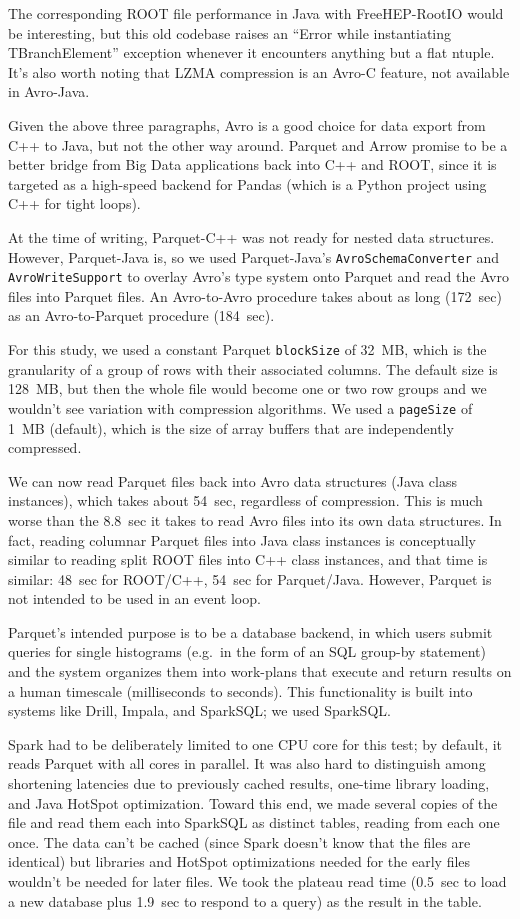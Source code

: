 \documentclass{article}
\begin{document}
The corresponding ROOT file performance in Java with FreeHEP-RootIO would be interesting, but this old codebase raises an ``Error while instantiating TBranchElement'' exception whenever it encounters anything but a flat ntuple. It's also worth noting that LZMA compression is an Avro-C feature, not available in Avro-Java.

Given the above three paragraphs, Avro is a good choice for data export from C++ to Java, but not the other way around. Parquet and Arrow promise to be a better bridge from Big Data applications back into C++ and ROOT, since it is targeted as a high-speed backend for Pandas (which is a Python project using C++ for tight loops).

At the time of writing, Parquet-C++ was not ready for nested data structures. However, Parquet-Java is, so we used Parquet-Java's {\tt AvroSchemaConverter} and {\tt AvroWriteSupport} to overlay Avro's type system onto Parquet and read the Avro files into Parquet files. An Avro-to-Avro procedure takes about as long (172~sec) as an Avro-to-Parquet procedure (184~sec). 

For this study, we used a constant Parquet {\tt blockSize} of 32~MB, which is the granularity of a group of rows with their associated columns. The default size is 128~MB, but then the whole file would become one or two row groups and we wouldn't see variation with compression algorithms. We used a {\tt pageSize} of 1~MB (default), which is the size of array buffers that are independently compressed.

We can now read Parquet files back into Avro data structures (Java class instances), which takes about 54~sec, regardless of compression. This is much worse than the 8.8~sec it takes to read Avro files into its own data structures. In fact, reading columnar Parquet files into Java class instances is conceptually similar to reading split ROOT files into C++ class instances, and that time is similar: 48~sec for ROOT/C++, 54~sec for Parquet/Java. However, Parquet is not intended to be used in an event loop.

Parquet's intended purpose is to be a database backend, in which users submit queries for single histograms (e.g.\ in the form of an SQL group-by statement) and the system organizes them into work-plans that execute and return results on a human timescale (milliseconds to seconds). This functionality is built into systems like Drill, Impala, and SparkSQL; we used SparkSQL.

Spark had to be deliberately limited to one CPU core for this test; by default, it reads Parquet with all cores in parallel. It was also hard to distinguish among shortening latencies due to previously cached results, one-time library loading, and Java HotSpot optimization. Toward this end, we made several copies of the file and read them each into SparkSQL as distinct tables, reading from each one once. The data can't be cached (since Spark doesn't know that the files are identical) but libraries and HotSpot optimizations needed for the early files wouldn't be needed for later files. We took the plateau read time (0.5~sec to load a new database plus 1.9~sec to respond to a query) as the result in the table.
\end{document}
